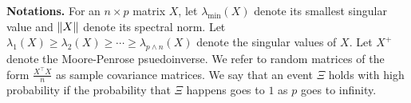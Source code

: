 \textbf{Notations.}
For an $n\times p$ matrix $X$, let $\lambda_{\min}(X)$ denote its smallest singular value and $\|X\|$ denote its spectral norm.
Let $\lambda_1(X) \ge \lambda_2(X) \ge \cdots \ge \lambda_{p\wedge n}(X)$ denote the singular values of $X$.
Let $X^+$ denote the Moore-Penrose psuedoinverse.
We refer to random matrices of the form $\frac {X^\top X} n$ as sample covariance matrices.
We say that an event $\Xi$ holds with high probability if the probability that $\Xi$ happens goes to $1$ as $p$ goes to infinity.
